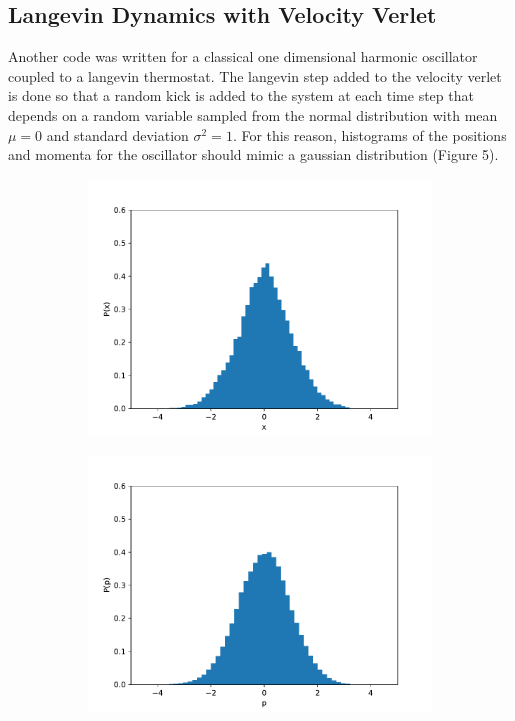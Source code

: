 \documentclass{article}
\begin{document}
\subsection{Langevin Dynamics with Velocity Verlet}
Another code was written for a classical one dimensional harmonic oscillator coupled to a langevin thermostat.
The langevin step added to the velocity verlet is done so that a random kick is added to the system at each time step that depends on a random variable sampled from the normal distribution with mean $\mu = 0$ and standard deviation $\sigma^2 = 1$.
For this reason, histograms of the positions and momenta for the oscillator should mimic a gaussian distribution (Figure 5).
\begin{figure}[H]
    \centering
    \begin{subfigure}[b]{0.49\textwidth}
        \includegraphics[width=\textwidth]{Figures/langevin/xhist.pdf}
    \end{subfigure}
    \begin{subfigure}[b]{0.49\textwidth}
        \includegraphics[width=\textwidth]{Figures/langevin/phist.pdf}

\end{subfigure}
\end{figure}
\end{document}
